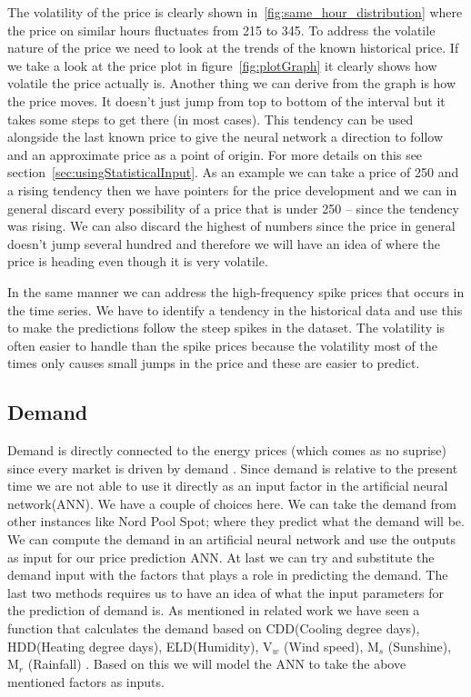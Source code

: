 The volatility of the price is clearly shown in~\ref{fig:same_hour_distribution} where the price on similar hours fluctuates from 215 to 345. To address the volatile nature of the price we need to look at the trends of the known historical price. If we take a look at the price plot in figure~\ref{fig:plotGraph} it clearly shows how volatile the price actually is. Another thing we can derive from the graph is how the price moves. It doesn't just jump from top to bottom of the interval but it takes some steps to get there (in most cases). This tendency can be used alongside the last known price to give the neural network a direction to follow and an approximate price as a point of origin. For more details on this see section~\ref{sec:usingStatisticalInput}. As an example we can take a price of 250 and a rising tendency then we have pointers for the price development and we can in general discard every possibility of a price that is under 250 -- since the tendency was rising. We can also discard the highest of numbers since the price in general doesn't jump several hundred and therefore we will have an idea of where the price is heading even though it is very volatile.

In the same manner we can address the high-frequency spike prices that occurs in the time series. We have to identify a tendency in the historical data and use this to make the predictions follow the steep spikes in the dataset. The volatility is often easier to handle than the spike prices because the volatility most of the times only causes small jumps in the price and these are easier to predict.

\subsection{Demand}
Demand is directly connected to the energy prices (which comes as no suprise) since every market is driven by demand \cite{singhal2011electricity}. Since demand is relative to the present time we are not able to use it directly as an input factor in the artificial neural network(ANN). We have a couple of choices here. We can take the demand from other instances like Nord Pool Spot; where they predict what the demand will be. We can compute the demand in an artificial neural network and use the outputs as input for our price prediction ANN. At last we can try and substitute the demand input with the factors that plays a role in predicting the demand. The last two methods requires us to have an idea of what the input parameters for the prediction of demand is. As mentioned in related work we have seen a function that calculates the demand based on CDD(Cooling degree days), HDD(Heating degree days), ELD(Humidity), V$_w$ (Wind speed), M$_s$ (Sunshine), M$_r$ (Rainfall) \cite{19}. Based on this we will model the ANN to take the above mentioned factors as inputs.

